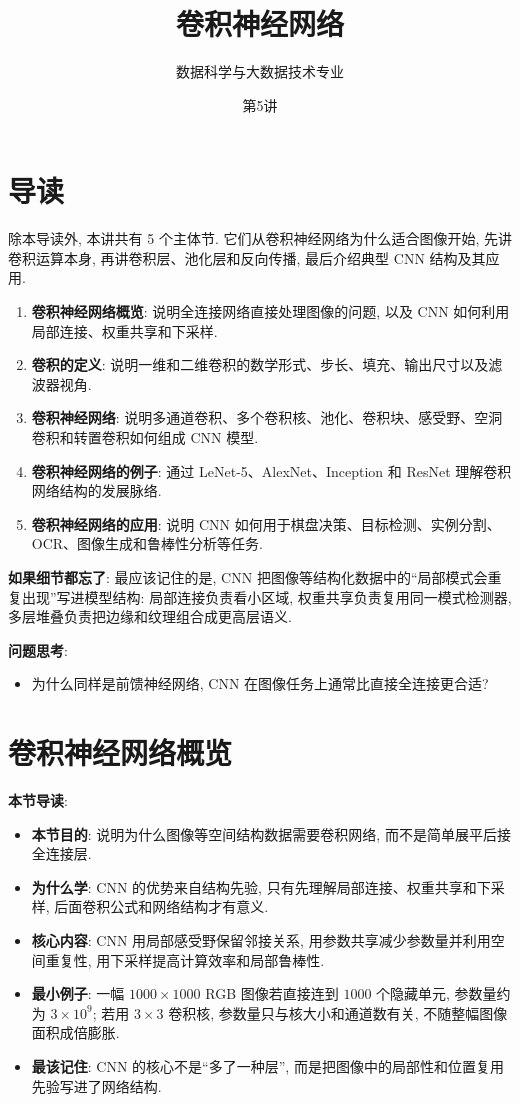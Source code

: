 \documentclass{../nndlcourse}
\begin{document}
\title{卷积神经网络 }
\author{数据科学与大数据技术专业}
\date{第5讲 }
\maketitle
\section{导读}

除本导读外, 本讲共有 5 个主体节. 它们从卷积神经网络为什么适合图像开始, 先讲卷积运算本身, 再讲卷积层、池化层和反向传播, 最后介绍典型 CNN 结构及其应用.

\begin{enumerate}
    \item \textbf{卷积神经网络概览}: 说明全连接网络直接处理图像的问题, 以及 CNN 如何利用局部连接、权重共享和下采样.
    \item \textbf{卷积的定义}: 说明一维和二维卷积的数学形式、步长、填充、输出尺寸以及滤波器视角.
    \item \textbf{卷积神经网络}: 说明多通道卷积、多个卷积核、池化、卷积块、感受野、空洞卷积和转置卷积如何组成 CNN 模型.
    \item \textbf{卷积神经网络的例子}: 通过 LeNet-5、AlexNet、Inception 和 ResNet 理解卷积网络结构的发展脉络.
    \item \textbf{卷积神经网络的应用}: 说明 CNN 如何用于棋盘决策、目标检测、实例分割、OCR、图像生成和鲁棒性分析等任务.
\end{enumerate}

\textbf{如果细节都忘了}: 最应该记住的是, CNN 把图像等结构化数据中的“局部模式会重复出现”写进模型结构: 局部连接负责看小区域, 权重共享负责复用同一模式检测器, 多层堆叠负责把边缘和纹理组合成更高层语义.

\textbf{问题思考}:
\begin{itemize}
    \item 为什么同样是前馈神经网络, CNN 在图像任务上通常比直接全连接更合适?
\end{itemize}

\section{卷积神经网络概览}

\textbf{本节导读}:
\begin{itemize}
    \item \textbf{本节目的}: 说明为什么图像等空间结构数据需要卷积网络, 而不是简单展平后接全连接层.
    \item \textbf{为什么学}: CNN 的优势来自结构先验, 只有先理解局部连接、权重共享和下采样, 后面卷积公式和网络结构才有意义.
    \item \textbf{核心内容}: CNN 用局部感受野保留邻接关系, 用参数共享减少参数量并利用空间重复性, 用下采样提高计算效率和局部鲁棒性.
    \item \textbf{最小例子}: 一幅 $1000\times1000$ RGB 图像若直接连到 $1000$ 个隐藏单元, 参数量约为 $3\times10^9$; 若用 $3\times3$ 卷积核, 参数量只与核大小和通道数有关, 不随整幅图像面积成倍膨胀.
    \item \textbf{最该记住}: CNN 的核心不是“多了一种层”, 而是把图像中的局部性和位置复用先验写进了网络结构.
\end{itemize}
\end{document}
